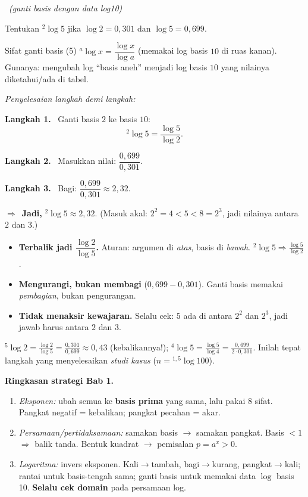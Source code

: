 \documentclass[11pt,a4paper]{report}
\theoremstyle{gaya}
\newcommand{\jawab}{\par\smallskip\noindent\textit{\textcolor{oranye}{Penyelesaian langkah demi langkah:}}\par\smallskip}
\newcommand{\langkah}[1]{\par\smallskip\noindent\textbf{\textcolor{biru}{Langkah #1.}}\ }
\newcommand{\jadi}{\par\smallskip\noindent$\Rightarrow$\ \textbf{Jadi, }}
\newcommand{\soalno}[2]{%
  \par\bigskip
  \noindent{\large\bfseries\color{ungu}\rule[-2pt]{4pt}{14pt}\ Soal #1}%
  \ {\normalfont\itshape\color{gray}(#2)}\par\nopagebreak\smallskip}
\begin{document}
\soalno{1.3.10}{ganti basis dengan data log10}
\begin{soalbox}{}
Tentukan ${}^{2}\!\log 5$ jika $\log 2 = 0{,}301$ dan $\log 5 = 0{,}699$.
\end{soalbox}

\begin{ingat}{Sifat ganti basis (5)}
${}^{a}\!\log x = \dfrac{\log x}{\log a}$ (memakai log basis $10$ di ruas kanan).
Gunanya: mengubah log ``basis aneh'' menjadi log basis $10$ yang nilainya
diketahui/ada di tabel.
\end{ingat}

\jawab
\langkah{1} Ganti basis $2$ ke basis $10$:
\[
{}^{2}\!\log5 = \frac{\log5}{\log2}.
\]
\langkah{2} Masukkan nilai: $\dfrac{0{,}699}{0{,}301}$.
\langkah{3} Bagi: $\dfrac{0{,}699}{0{,}301}\approx 2{,}32$.
\jadi ${}^{2}\!\log5 \approx 2{,}32$. (Masuk akal: $2^2=4<5<8=2^3$, jadi
nilainya antara $2$ dan $3$.)

\begin{jebakan}
\begin{itemize}[leftmargin=*,topsep=2pt]
  \item \textbf{Terbalik jadi $\dfrac{\log2}{\log5}$.} Aturan: argumen di
  \emph{atas}, basis di \emph{bawah}. ${}^{2}\!\log5\Rightarrow\frac{\log5}{\log2}$.
  \item \textbf{Mengurangi, bukan membagi} ($0{,}699-0{,}301$). Ganti basis
  memakai \emph{pembagian}, bukan pengurangan.
  \item \textbf{Tidak menaksir kewajaran.} Selalu cek: $5$ ada di antara
  $2^2$ dan $2^3$, jadi jawab harus antara $2$ dan $3$.
\end{itemize}
\end{jebakan}

\begin{variasi}
${}^{5}\!\log2=\frac{\log2}{\log5}=\frac{0{,}301}{0{,}699}\approx0{,}43$
(kebalikannya!); ${}^{4}\!\log5=\frac{\log5}{\log4}=\frac{0{,}699}{2\cdot0{,}301}$.
Inilah tepat langkah yang menyelesaikan \emph{studi kasus}
($n={}^{1{,}5}\!\log100$).
\end{variasi}

\begin{tips}
\textbf{Ringkasan strategi Bab 1.}
\begin{enumerate}[leftmargin=*,topsep=2pt]
  \item \emph{Eksponen:} ubah semua ke \textbf{basis prima} yang sama, lalu
  pakai 8 sifat. Pangkat negatif = kebalikan; pangkat pecahan = akar.
  \item \emph{Persamaan/pertidaksamaan:} samakan basis $\to$ samakan pangkat.
  Basis $<1$ $\Rightarrow$ balik tanda. Bentuk kuadrat $\to$ pemisalan $p=a^x>0$.
  \item \emph{Logaritma:} invers eksponen. Kali$\to$tambah, bagi$\to$kurang,
  pangkat$\to$kali; rantai untuk basis-tengah sama; ganti basis untuk memakai
  data $\log$ basis 10. \textbf{Selalu cek domain} pada persamaan log.
\end{enumerate}
\end{tips}
\end{document}
